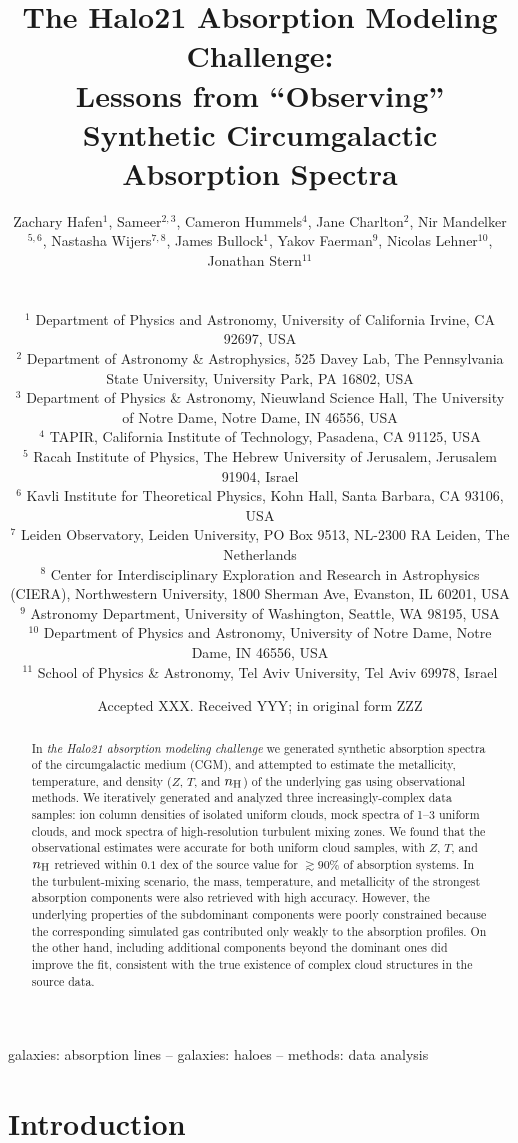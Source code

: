 \documentclass[fleqn,usenatbib]{mnras}
\title[``Observing'' Synthetic Circumgalactic Absorption Spectra]{The Halo21 Absorption Modeling Challenge:\\Lessons from ``Observing'' Synthetic Circumgalactic Absorption Spectra}
\author[Hafen, Sameer, et al.]{
\parbox{\textwidth}{
Zachary Hafen$^{1}$,
Sameer$^{2,3}$,
Cameron Hummels$^4$,
Jane Charlton$^2$,
Nir Mandelker$^{5, 6}$,
Nastasha Wijers$^{7, 8}$,
James Bullock$^{1}$,
Yakov Faerman$^{9}$,
Nicolas Lehner$^{10}$,
Jonathan Stern$^{11}$
} \vspace{0.4cm}\\
\parbox{\textwidth}{
$^1$ Department of Physics and Astronomy, University of California Irvine, CA 92697, USA \\
$^{2}$ Department of Astronomy \& Astrophysics, 525 Davey Lab, The Pennsylvania State University, University Park, PA 16802, USA \\
$^{3}$ Department of Physics \& Astronomy, Nieuwland Science Hall, The University of Notre Dame, Notre Dame, IN 46556, USA \\
$^4$ TAPIR, California Institute of Technology, Pasadena, CA 91125, USA \\
$^5$ Racah Institute of Physics, The Hebrew University of Jerusalem,
Jerusalem 91904, Israel \\
$^6$ Kavli Institute for Theoretical Physics, Kohn Hall, Santa Barbara, CA 93106, USA\\
$^7$ Leiden Observatory, Leiden University, PO Box 9513, NL-2300 RA Leiden, The Netherlands \\
$^8$ Center for Interdisciplinary Exploration and Research in Astrophysics (CIERA), Northwestern University, 1800 Sherman Ave, Evanston, IL 60201, USA \\
$^9$ Astronomy Department, University of Washington, Seattle, WA 98195, USA \\
$^{10}$ Department of Physics and Astronomy, University of Notre Dame, Notre Dame, IN 46556, USA \\
$^{11}$ School of Physics \& Astronomy, Tel Aviv University, Tel Aviv 69978, Israel
}
}
\date{Accepted XXX. Received YYY; in original form ZZZ}
\begin{document}
\label{firstpage}
\pagerange{\pageref{firstpage}--\pageref{lastpage}}
\maketitle

\begin{abstract}
In \textit{the Halo21 absorption modeling challenge} we generated synthetic absorption spectra of the circumgalactic medium (CGM),
and attempted to estimate the metallicity, temperature, and density ($Z$, $T$, and $n_{\rm H}$) of the underlying gas using observational methods.
We iteratively generated and analyzed three increasingly-complex data samples:
ion column densities of isolated uniform clouds,
mock spectra of 1--3 uniform clouds,
and mock spectra of high-resolution turbulent mixing zones.
We found that the observational estimates were accurate for both uniform cloud samples, with $Z$, $T$, and $n_{\rm H}$ retrieved within $0.1$ dex of the source value for $\gtrsim 90\%$ of absorption systems.
In the turbulent-mixing scenario, the mass, temperature, and metallicity of the strongest absorption components were also retrieved with high accuracy.
However, the underlying properties of the subdominant components were poorly constrained because the corresponding simulated gas contributed only weakly to the  absorption profiles.
On the other hand, including
additional components beyond the dominant ones did improve the fit, consistent with the true existence of complex cloud structures in the source data. 
\end{abstract}

\begin{keywords}
galaxies: absorption lines -- galaxies: haloes -- methods: data analysis
\end{keywords}



\section{Introduction}
\end{document}
